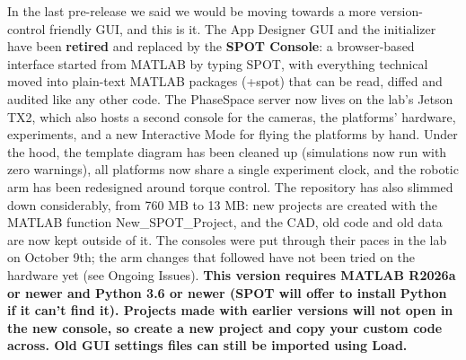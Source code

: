 \documentclass[11pt]{article}
\begin{document}
In the last pre-release we said we would be moving towards a more version-control friendly GUI, and this is it. The App Designer GUI and the initializer have been \textbf{retired} and replaced by the \textbf{SPOT Console}: a browser-based interface started from MATLAB by typing SPOT, with everything technical moved into plain-text MATLAB packages (+spot) that can be read, diffed and audited like any other code. The PhaseSpace server now lives on the lab's Jetson TX2, which also hosts a second console for the cameras, the platforms' hardware, experiments, and a new Interactive Mode for flying the platforms by hand. Under the hood, the template diagram has been cleaned up (simulations now run with zero warnings), all platforms now share a single experiment clock, and the robotic arm has been redesigned around torque control. The repository has also slimmed down considerably, from 760 MB to 13 MB: new projects are created with the MATLAB function New\_SPOT\_Project, and the CAD, old code and old data are now kept outside of it. The consoles were put through their paces in the lab on October 9th; the arm changes that followed have not been tried on the hardware yet (see Ongoing Issues). \textbf{This version requires MATLAB R2026a or newer and Python 3.6 or newer (SPOT will offer to install Python if it can't find it). Projects made with earlier versions will not open in the new console, so create a new project and copy your custom code across. Old GUI settings files can still be imported using Load.}

\end{document}
